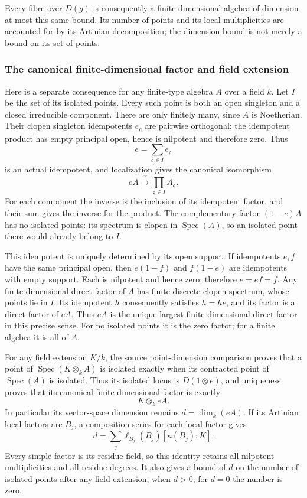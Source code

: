 Every fibre over \(D(g)\) is consequently a finite-dimensional algebra of dimension at most this same bound. Its number of points and its local multiplicities are accounted for by its Artinian decomposition; the dimension bound is not merely a bound on its set of points.

\subsubsection{The canonical finite-dimensional factor and field extension}\label{the-canonical-finite-dimensional-factor-and-field-extension}

Here is a separate consequence for any finite-type algebra \(A\) over a field \(k\). Let \(I\) be the set of its isolated points. Every such point is both an open singleton and a closed irreducible component. There are only finitely many, since \(A\) is Noetherian. Their clopen singleton idempotents \(e_{\mathfrak q}\) are pairwise orthogonal: the idempotent product has empty principal open, hence is nilpotent and therefore zero. Thus \[
 e=\sum_{\mathfrak q\in I}e_{\mathfrak q}
\] is an actual idempotent, and localization gives the canonical isomorphism \[
 eA\xrightarrow{\cong}\prod_{\mathfrak q\in I}A_{\mathfrak q}.
\] For each component the inverse is the inclusion of its idempotent factor, and their sum gives the inverse for the product. The complementary factor \((1-e)A\) has no isolated points: its spectrum is clopen in \(\operatorname{Spec}(A)\), so an isolated point there would already belong to \(I\).

This idempotent is uniquely determined by its open support. If idempotents \(e,f\) have the same principal open, then \(e(1-f)\) and \(f(1-e)\) are idempotents with empty support. Each is nilpotent and hence zero; therefore \(e=ef=f\). Any finite-dimensional direct factor of \(A\) has finite discrete clopen spectrum, whose points lie in \(I\). Its idempotent \(h\) consequently satisfies \(h=he\), and its factor is a direct factor of \(eA\). Thus \(eA\) is the unique largest finite-dimensional direct factor in this precise sense. For no isolated points it is the zero factor; for a finite algebra it is all of \(A\).

For any field extension \(K/k\), the source point-dimension comparison proves that a point of \(\operatorname{Spec}(K\otimes_k A)\) is isolated exactly when its contracted point of \(\operatorname{Spec}(A)\) is isolated. Thus its isolated locus is \(D(1\otimes e)\), and uniqueness proves that its canonical finite-dimensional factor is exactly \[
 K\otimes_k eA.
\] In particular its vector-space dimension remains \(d=\dim_k(eA)\). If its Artinian local factors are \(B_j\), a composition series for each local factor gives \[
 d=\sum_j\ell_{B_j}(B_j)[\kappa(B_j):K].
\] Every simple factor is its residue field, so this identity retains all nilpotent multiplicities and all residue degrees. It also gives a bound of \(d\) on the number of isolated points after any field extension, when \(d>0\); for \(d=0\) the number is zero.

